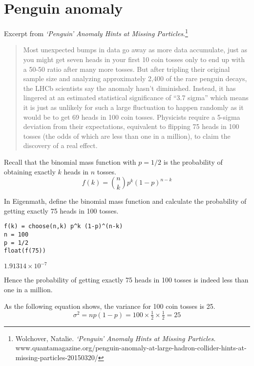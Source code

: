 

\section*{Penguin anomaly}

Excerpt from {\it `Penguin' Anomaly Hints at Missing Particles}.\footnote{
Wolchover, Natalie.
{\it `Penguin' Anomaly Hints at Missing Particles.}\\
www.quantamagazine.org/penguin-anomaly-at-large-hadron-collider-hints-at-missing-particles-20150320/}

\begin{quote}
Most unexpected bumps in data go away as more data accumulate, just as you might get seven heads in your first 10 coin tosses only to end up with a 50-50 ratio after many more tosses. But after tripling their original sample size and analyzing approximately 2,400 of the rare penguin decays, the LHCb scientists say the anomaly hasn't diminished. Instead, it has lingered at an estimated statistical significance of ``3.7 sigma'' which means it is just as unlikely for such a large fluctuation to happen randomly as it would be to get 69 heads in 100 coin tosses. Physicists require a 5-sigma deviation from their expectations, equivalent to flipping 75 heads in 100 tosses (the odds of which are less than one in a million), to claim the discovery of a real effect.
\end{quote}

Recall that the binomial mass function with $p=1/2$
is the probability of obtaining exactly
$k$ heads in $n$ tosses.
\begin{equation*}
f(k)={n\choose k}p^k(1-p)^{n-k}
\end{equation*}

In Eigenmath, define the binomial mass function
and calculate the probability
of getting exactly 75 heads in 100 tosses.

{\color{blue}
\begin{verbatim}
f(k) = choose(n,k) p^k (1-p)^(n-k)
n = 100
p = 1/2
float(f(75))
\end{verbatim}}

$1.91314\times10^{-7}$

\bigskip
Hence the probability of getting exactly 75 heads in 100 tosses is indeed
less than one in a million.

\bigskip
As the following equation shows, the variance for 100 coin tosses is 25.
\begin{equation*}
\sigma^2=np(1-p)=100\times\tfrac{1}{2}\times\tfrac{1}{2}=25
\end{equation*}

